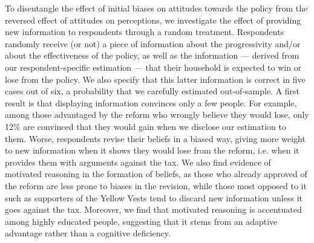 \documentclass[11pt]{article}
\begin{document}
To disentangle the effect of initial biases on attitudes towards the policy from the reversed effect of attitudes on perceptions, we investigate the effect of providing new information to respondents through a random treatment. Respondents randomly receive (or not) a piece of information about the progressivity and/or about the effectiveness of the policy, as well as the information --- derived from our respondent-specific estimation --- that their household is expected to win or lose from the policy. We also specify that this latter information is correct in five cases out of six, a probability that we carefully estimated out-of-sample. A first result is that displaying information convinces only a few people. For example, among those advantaged by the reform who wrongly believe they would lose, only 12\% are convinced that they would gain when we disclose our estimation to them. Worse, respondents revise their beliefs in a biased way, giving more weight to new information when it shows they would lose from the reform, i.e. when it provides them with arguments against the tax. We also find evidence of motivated reasoning in the formation of beliefs, as those who already approved of the reform are less prone to biases in the revision, while those most opposed to it such as supporters of the Yellow Vests tend to discard new information unless it goes against the tax. Moreover, we find that motivated reasoning is accentuated among highly educated people, suggesting that it stems from an adaptive advantage rather than a cognitive deficiency.
\end{document}
